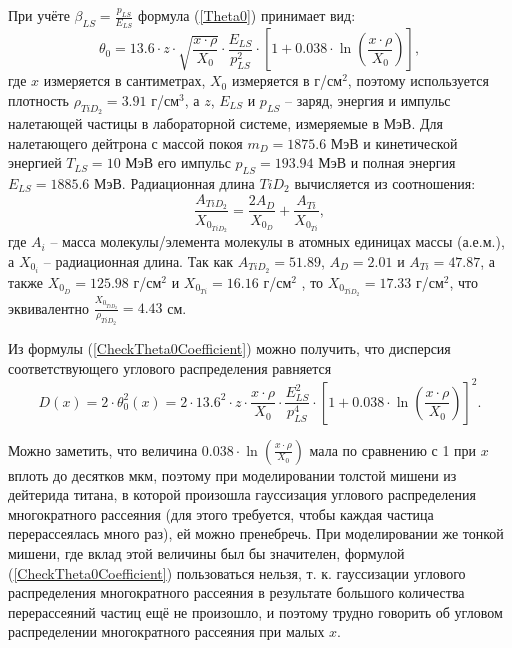 \documentclass[a4paper,12pt]{article}
\begin{document}
\begin{large}
	При учёте $\beta_{LS}=\frac{p_{LS}}{E_{LS}}$ формула (\ref{Theta0}) принимает вид:
\begin{equation}
  \label{CheckTheta0Coefficient}
  \theta_0=13.6 \cdot z \cdot \sqrt{\frac{x\cdot \rho}{X_0}} \cdot \frac{E_{LS}}{p^2_{LS}} \cdot\left[ 1+0.038\cdot\ln\left(\frac{x\cdot \rho}{X_0}\right)\right],
\end{equation}
где $x$ измеряется в сантиметрах, $X_0$ измеряется в г/см$^2$, поэтому используется плотность $\rho_{TiD_2}=3.91$ г/см$^3$, а $z$, $E_{LS}$ и $p_{LS}$ -- заряд, энергия и импульс налетающей частицы в лабораторной системе, измеряемые в МэВ. Для налетающего дейтрона с массой покоя $m_D=1875.6$ МэВ и кинетической энергией $T_{LS}=10$ МэВ его импульс $p_{LS}=193.94$ МэВ и полная энергия $E_{LS}=1885.6$ МэВ. Радиационная длина $TiD_2$ вычисляется из соотношения:
\begin{equation}
  \label{RadLength}
  \frac{A_{TiD_2}}{X_{0_{TiD_2}}}=\frac{2 A_{D}}{X_{0_{D}}}+\frac{A_{Ti}}{X_{0_{Ti}}},
\end{equation}
где $A_i$ -- масса молекулы/элемента молекулы в атомных единицах массы (а.е.м.), а $X_{0_i}$ -- радиационная длина.
  Так как $A_{TiD_2}=51.89$, $A_{D}=2.01$ и $A_{Ti}=47.87$, а также $X_{0_{D}}=125.98$ г/см$^2$ и $X_{0_{Ti}}=16.16$ г/см$^2$ \cite{PDG}, то $X_{0_{TiD_2}}=17.33$ г/см$^2$, что эквивалентно $\frac{X_{0_{TiD_2}}}{\rho_{TiD_2}}=4.43$ см.
  
  Из формулы (\ref{CheckTheta0Coefficient}) можно получить, что дисперсия соответствующего углового распределения равняется
\begin{equation}
  \label{Theta0Dispersion}
   D(x)=2 \cdot \theta^2_0(x)=2 \cdot 13.6^2 \cdot z \cdot \frac{x\cdot \rho}{X_0} \cdot \frac{E^2_{LS}}{p^4_{LS}} \cdot\left[ 1+0.038\cdot\ln\left(\frac{x\cdot \rho}{X_0}\right)\right]^2.
\end{equation}  
  
  Можно заметить, что величина $0.038\cdot\ln\left(\frac{x\cdot \rho}{X_0}\right)$ мала по сравнению с 1 при $x$ вплоть до десятков мкм, поэтому при моделировании толстой мишени из дейтерида титана, в которой произошла гауссизация углового распределения многократного рассеяния (для этого требуется, чтобы каждая частица перерассеялась много раз), ей можно пренебречь. При моделировании же тонкой мишени, где вклад этой величины был бы значителен, формулой  (\ref{CheckTheta0Coefficient}) пользоваться нельзя, т. к. гауссизации углового распределения многократного рассеяния в результате большого количества перерассеяний частиц ещё не произошло, и поэтому трудно говорить об угловом распределении многократного рассеяния при малых $x$.
  

\end{large}
\end{document}
